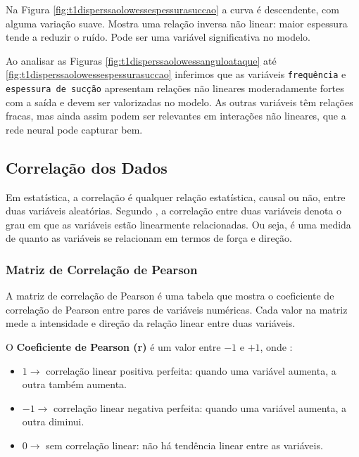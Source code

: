 \documentclass[12pt,a4paper,oneside]{report}
\newcommand{\fig}[1]{Figura \ref{#1}}
\begin{document}
Na \fig{fig:t1disperssaolowessespessurasuccao} a curva é descendente, com alguma variação suave. Mostra uma relação inversa não linear: maior espessura tende a reduzir o ruído. Pode ser uma variável significativa no modelo.

Ao analisar as Figuras \ref{fig:t1disperssaolowessanguloataque} até \ref{fig:t1disperssaolowessespessurasuccao} inferimos que as variáveis \texttt{frequência} e \texttt{espessura de sucção} apresentam relações não lineares moderadamente fortes com a saída e devem ser valorizadas no modelo. As outras variáveis têm relações fracas, mas ainda assim podem ser relevantes em interações não lineares, que a rede neural pode capturar bem.


	
	\subsection{Correla\c{c}\~ao dos Dados}
	
	Em estatística, a correlação é qualquer relação estatística, causal ou não, entre duas variáveis aleatórias. Segundo \citeauthor{silva:2023}, a correlação entre duas variáveis denota o grau em que as variáveis estão linearmente relacionadas. Ou seja, é uma medida de quanto as variáveis se relacionam em termos de força e direção.
	
	\subsubsection{Matriz de Correlação de Pearson}
	
	A matriz de correlação de Pearson é uma tabela que mostra o coeficiente de correlação de Pearson entre pares de variáveis numéricas. Cada valor na matriz mede a intensidade e direção da relação linear entre duas variáveis.
	
	O \textbf{Coeficiente de Pearson (r)} é um valor entre $-1$ e $+1$, onde :
	\begin{itemize}
		\item $1 \rightarrow$ correlação linear positiva perfeita: quando uma variável aumenta, a outra também aumenta.
		\item $-1 \rightarrow$ correlação linear negativa perfeita: quando uma variável aumenta, a outra diminui.
		\item $0 \rightarrow$ sem correlação linear: não há tendência linear entre as variáveis.
	\end{itemize}
	
\end{document}

